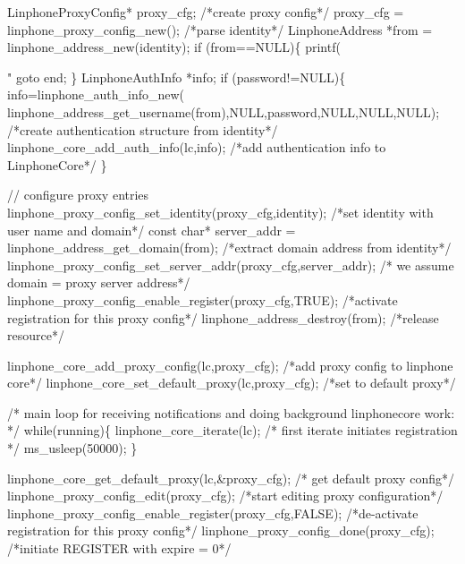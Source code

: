 \begin{DoxyCodeInclude}
{        LinphoneProxyConfig* proxy\_cfg;
        \textcolor{comment}{/*create proxy config*/}
        proxy\_cfg = linphone_proxy_config_new();
        \textcolor{comment}{/*parse identity*/}
        LinphoneAddress *from = linphone_address_new(identity);
        \textcolor{keywordflow}{if} (from==NULL)\{
                printf(\textcolor{stringliteral}{"%
                \textcolor{keywordflow}{goto} end;
        \}
                LinphoneAuthInfo *info;
                \textcolor{keywordflow}{if} (password!=NULL)\{
                        info=linphone_auth_info_new(
      linphone_address_get_username(from),NULL,password,NULL,NULL,NULL); \textcolor{comment}{/*create authentication structure from
       identity*/}
                        linphone_core_add_auth_info(lc,info); \textcolor{comment}{/*add authentication info to LinphoneCore*/}
                \}

                \textcolor{comment}{// configure proxy entries}
                linphone_proxy_config_set_identity(proxy\_cfg,identity); \textcolor{comment}{/*set identity with user name and
       domain*/}
                \textcolor{keyword}{const} \textcolor{keywordtype}{char}* server\_addr = linphone_address_get_domain(from); \textcolor{comment}{/*extract domain address from
       identity*/}
                linphone_proxy_config_set_server_addr(proxy\_cfg,server\_addr); \textcolor{comment}{/* we assume domain = proxy
       server address*/}
                linphone_proxy_config_enable_register(proxy\_cfg,TRUE); \textcolor{comment}{/*activate registration for this
       proxy config*/}
                linphone_address_destroy(from); \textcolor{comment}{/*release resource*/}

                linphone_core_add_proxy_config(lc,proxy\_cfg); \textcolor{comment}{/*add proxy config to linphone core*/}
                linphone_core_set_default_proxy(lc,proxy\_cfg); \textcolor{comment}{/*set to default proxy*/}


        \textcolor{comment}{/* main loop for receiving notifications and doing background linphonecore work: */}
        \textcolor{keywordflow}{while}(running)\{
                linphone_core_iterate(lc); \textcolor{comment}{/* first iterate initiates registration */}
                ms\_usleep(50000);
        \}

        linphone_core_get_default_proxy(lc,&proxy\_cfg); \textcolor{comment}{/* get default proxy config*/}
        linphone_proxy_config_edit(proxy\_cfg); \textcolor{comment}{/*start editing proxy configuration*/}
        linphone_proxy_config_enable_register(proxy\_cfg,FALSE); \textcolor{comment}{/*de-activate registration for this proxy
       config*/}
        linphone_proxy_config_done(proxy\_cfg); \textcolor{comment}{/*initiate REGISTER with expire = 0*/}

}}
\end{DoxyCodeInclude}
